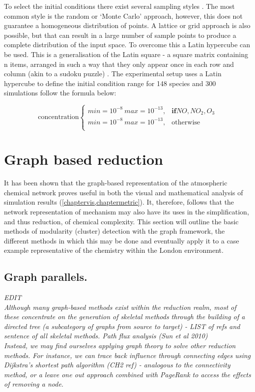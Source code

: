 To select the initial conditions there exist several sampling styles \cite{sampling}. The most common style is the random or `Monte Carlo' approach, however, this does not guarantee a homogeneous distribution of points. A lattice or grid approach is also possible, but that can result in a large number of sample points to produce a complete distribution of the input space. To overcome this a Latin hypercube can be used. This is a generalisation of the Latin square  -  a square matrix containing n items, arranged in such a way that they only appear once in each row and column (akin to a sudoku puzzle) \cite{lsq}. The experimental setup uses a Latin hypercube to define the initial condition range for 148 species and 300 simulations follow the formula below:

\begin{equation}
\text{concentration}
    \begin{cases}
      min = 10^{-8} \ max=10^{-13} , & \mathbf{if} NO,NO_2,O_3\\
      min = 10^{-8} \ max=10^{-13} , & \text{otherwise}\\
    \end{cases}
\label{eqn:icslhs}
  \end{equation}
\section{Graph based reduction}\label{sec:graphreduction}
It has been shown that the graph-based representation of the atmospheric chemical network proves useful in both the visual and mathematical analysis of simulation results (\autoref{chaptervis,chaptermetric}). It, therefore, follows that the network representation of mechanism may also have its uses in the simplification, and thus reduction, of chemical complexity.  This section will outline the basic methods of modularity (cluster) detection with the graph framework, the different methods in which this may be done and eventually apply it to a case example representative of the chemistry within the London environment.




\subsection{Graph parallels. }

\textit{
EDIT\\
Although many graph-based methods exist within the reduction realm, most of these concentrate on the generation of skeletal methods through the building of a directed tree (a subcategory of graphs from source to target) - LIST of refs and sentence of all skeletal methods. Path flux analysis (Sun et al 2010)\\
Instead, we may find ourselves applying graph theory to solve other reduction methods. For instance, we can trace back influence through connecting edges using Dijkstra's shortest path algorithm (CH2 ref) - analogous to the connectivity method, or a leave one out approach combined with PageRank to access the effects of removing a node.
}

